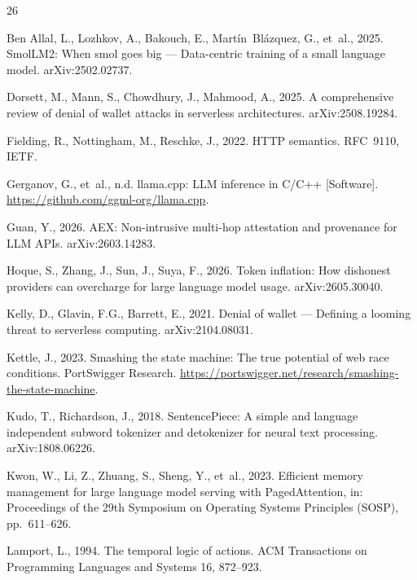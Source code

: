 \documentclass[preprint,3p,authoryear,12pt]{elsarticle}
\begin{document}

\begin{thebibliography}{26}

Ben Allal, L., Lozhkov, A., Bakouch, E., Mart\'{i}n~Bl\'{a}zquez, G., et~al., 2025.
SmolLM2: When smol goes big --- Data-centric training of a small language model.
arXiv:2502.02737.

Dorsett, M., Mann, S., Chowdhury, J., Mahmood, A., 2025. A comprehensive review of
denial of wallet attacks in serverless architectures. arXiv:2508.19284.

Fielding, R., Nottingham, M., Reschke, J., 2022. HTTP semantics. RFC~9110, IETF.

Gerganov, G., et~al., n.d. llama.cpp: LLM inference in C/C++ [Software].
\url{https://github.com/ggml-org/llama.cpp}.

Guan, Y., 2026. AEX: Non-intrusive multi-hop attestation and provenance for LLM APIs.
arXiv:2603.14283.

Hoque, S., Zhang, J., Sun, J., Suya, F., 2026. Token inflation: How dishonest providers
can overcharge for large language model usage. arXiv:2605.30040.

Kelly, D., Glavin, F.G., Barrett, E., 2021. Denial of wallet --- Defining a looming
threat to serverless computing. arXiv:2104.08031.

Kettle, J., 2023. Smashing the state machine: The true potential of web race
conditions. PortSwigger Research.
\url{https://portswigger.net/research/smashing-the-state-machine}.

Kudo, T., Richardson, J., 2018. SentencePiece: A simple and language independent
subword tokenizer and detokenizer for neural text processing. arXiv:1808.06226.

Kwon, W., Li, Z., Zhuang, S., Sheng, Y., et~al., 2023. Efficient memory management for
large language model serving with PagedAttention, in: Proceedings of the 29th Symposium
on Operating Systems Principles (SOSP), pp.~611--626.

Lamport, L., 1994. The temporal logic of actions. ACM Transactions on Programming
Languages and Systems 16, 872--923.


\end{thebibliography}
\end{document}
